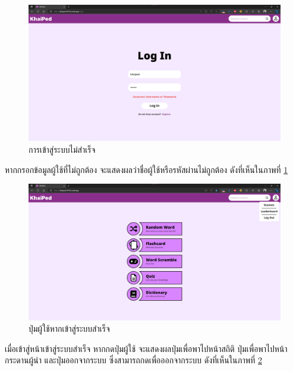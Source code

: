 \documentclass[12pt,oneside,openright,a4paper]{cpe-thai-project}
\begin{document}
\pagebreak
\begin{figure}[!h]\centering
	\includegraphics[width=\textwidth, keepaspectratio=true]{image/chap4/UI/login/login failed.png}
	\caption{{การเข้าสู่ระบบไม่สำเร็จ}}\label{fig:chap4UILogInFailed}
\end{figure}
\hspace{1cm}
หากกรอกข้อมูลผู้ใช้ที่ไม่ถูกต้อง จะแสดงผลว่าชื่อผู้ใช้หรือรหัสผ่านไม่ถูกต้อง ดังที่เห็นในภาพที่ \ref{fig:chap4UILogInFailed}


\begin{figure}[!h]\centering
	\includegraphics[width=\textwidth, keepaspectratio=true]{image/chap4/UI/stat/user button.png}
	\caption{{ปุ่มผู้ใช้หากเข้าสู่ระบบสำเร็จ}}\label{fig:chap4UIUserButton}
\end{figure}
\hspace{1cm}
เมื่อเข้าสู่หน้าเข้าสู่ระบบสำเร็จ หากกดปุ่มผู้ใช้ จะแสดงผลปุ่มเพื่อพาไปหน้าสถิติ ปุ่มเพื่อพาไปหน้ากระดานผู้นำ และปุ่มออกจากระบบ 
ซึ่งสามารถกดเพื่อออกจากระบบ ดังที่เห็นในภาพที่ \ref{fig:chap4UIUserButton}
\end{document}
